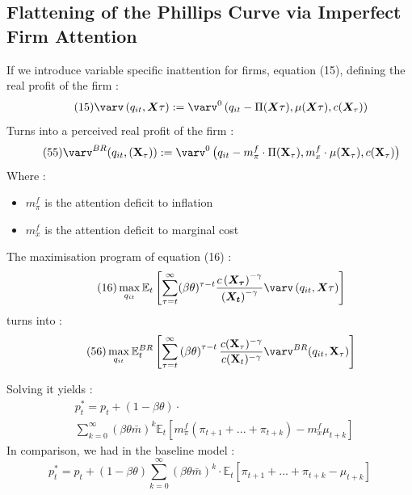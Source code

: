 \documentclass{beamer}
\begin{document}
\subsection{Flattening of the Phillips Curve via Imperfect Firm Attention}
\begin{frame}{\subsecname}
    If we introduce variable specific inattention for firms, equation (15), defining the real profit of the firm : 
    \begin{equation}\tag{15}
        \varv\left(q_{it},\bm{X}{\tau}\right):=\varv^{0}\left(q_{it}-\Pi(\bm{X}{\tau}),\mu(\bm{X}{\tau}),c(\bm{X}_{\tau})\right)
    \end{equation}
    Turns into a perceived real profit of the firm :
    \begin{equation}\tag{55}
        \varv^{BR}(q_{it},(\textbf{X}_{\tau})):=\varv^{0}\left(q_{it}-m^{f}_{\pi}\cdot\Pi(\textbf{X}_{\tau}),m^{f}_{x}\cdot\mu(\textbf{X}_{\tau}),c(\textbf{X}_{\tau})\right)
    \end{equation}
    Where : 
    \begin{itemize}
        \item $m^{f}_{\pi}$ is the attention deficit to inflation 
        \item $m^{f}_{x}$ is the attention deficit to marginal cost
    \end{itemize}
\end{frame}

\begin{frame}{\subsecname}
    The maximisation program of equation (16) :
    \begin{equation}\tag{16}
        \max_{q_{it}} \mathbb{E}_{t}\left[\sum_{\tau=t}^{\infty}(\beta\theta)^{\tau-t} \frac{c\left(\bm{X_{\tau}}\right)^{-\gamma}}{\left(\bm{X_{t}}\right)^{-\gamma}} \varv\left(q_{it},\bm{X}{\tau}\right)\right]
    \end{equation}
    turns into :
    \begin{equation}\tag{56}
        \max_{q_{it}}{\mathbb{E}_{t}^{BR}\left[\sum_{\tau=t}^{\infty}\left(\beta\theta\right)^{\tau-t}\frac{c(\textbf{X}_{\tau})^{-\gamma}}{c(\textbf{X}_{t})^{-\gamma}}\varv^{BR}(q_{it},\textbf{X}_{\tau})\right]}
    \end{equation}
\end{frame}

\begin{frame}{\subsecname}
    Solving it yields :
    \begin{equation}\tag{57}
        \begin{split}
            & p^{*}_{t} = p_{t}+(1-\beta\theta) \cdot \\
            & \sum^{\infty}_{k=0} \left(\beta\theta\bar{m}\right)^{k}\mathbb{E}_{t}\left[m^{f}_{\pi}(\pi_{t+1}+...+\pi_{t+k})-m^{f}_{x}\mu_{t+k}\right]
        \end{split}
    \end{equation}
    In comparison, we had in the baseline model : 
    \begin{equation*}\tag{27}
        p^{*}_{t}=p_{t}+(1-\beta\theta)\sum_{k=0}^{\infty}\left(\beta\theta\bar{m}\right)^{k}\cdot\mathbb{E}_{t}\left[\pi_{t+1}+...+\pi_{t+k}-\mu_{t+k}\right]
    \end{equation*}
\end{frame}
\end{document}
